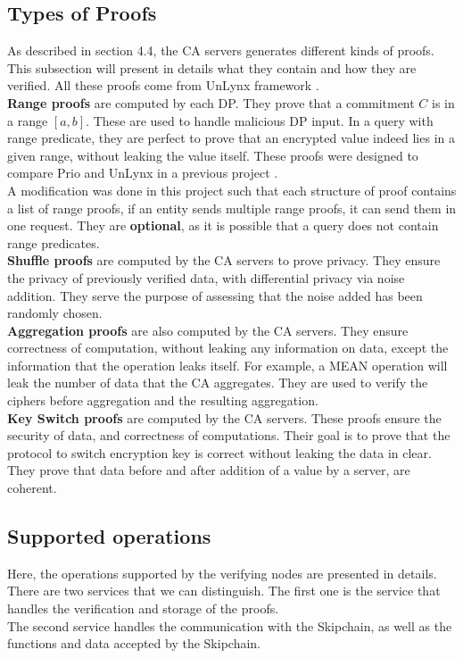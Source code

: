 \documentclass{article}
\begin{document}
\subsection{Types of Proofs}
As described in section 4.4, the CA servers generates different kinds of proofs. This subsection will present in details what they contain and how they are verified. All these proofs come from UnLynx framework \cite{maxproject,unlynx}.\\
\textbf{Range proofs} are computed by each DP. They prove that a commitment $C$ is in a range $[a,b]$. These are used to handle malicious DP input. In a query with range predicate, they are perfect to prove that an encrypted value indeed lies in a given range, without leaking the value itself. These proofs were designed to compare Prio and UnLynx in a previous project \cite{maxproject}.\\
A modification was done in this project such that each structure of proof contains a list of range proofs, if an entity sends multiple range proofs, it can send them in one request. They are \textbf{optional}, as it is possible that a query does not contain range predicates.\\
\textbf{Shuffle proofs} are computed by the CA servers to prove privacy. They ensure the privacy of previously verified data, with differential privacy via noise addition. They serve the purpose of assessing that the noise added has been randomly chosen.\\
\textbf{Aggregation proofs} are also computed by the CA servers. They ensure correctness of computation, without leaking any information on data, except the information that the operation leaks itself. For example, a MEAN operation will leak the number of data that the CA aggregates. They are used to verify the ciphers before aggregation and the resulting aggregation.\\
\textbf{Key Switch proofs} are computed by the CA servers. These proofs ensure the security of data, and correctness of computations. Their goal is to prove that the protocol to switch encryption key is correct without leaking the data in clear. They prove that data before and after addition of a value by a server, are coherent.\\

\subsection{Supported operations}
Here, the operations supported by the verifying nodes are presented in details.\\
There are two services that we can distinguish. The first one is the service that handles the verification and storage of the proofs.\\
The second service handles the communication with the Skipchain, as well as the functions and data accepted by the Skipchain.\\ 
\end{document}
